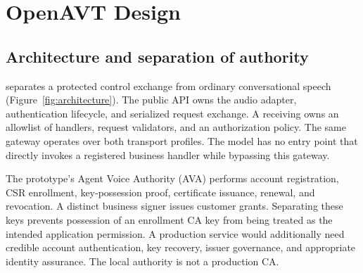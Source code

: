 \section{OpenAVT Design}
\label{sec:design}
\subsection{Architecture and separation of authority}
\sys{} separates a protected control exchange from ordinary conversational
speech (Figure~\ref{fig:architecture}). The public  API owns
the audio adapter, authentication lifecycle, and serialized request exchange.
A receiving  owns an allowlist of handlers, request validators,
and an authorization policy. The same gateway operates over both transport
profiles. The model has no entry point that directly invokes a registered
business handler while bypassing this gateway.

The prototype's Agent Voice Authority (AVA) performs account registration,
CSR enrollment, key-possession proof, certificate issuance, renewal, and
revocation. A distinct business signer issues customer grants. Separating these
keys prevents possession of an enrollment CA key from being treated as the
intended application permission. A production service would additionally need
credible account authentication, key recovery, issuer governance, and appropriate
identity assurance. The local authority is not a production CA.

